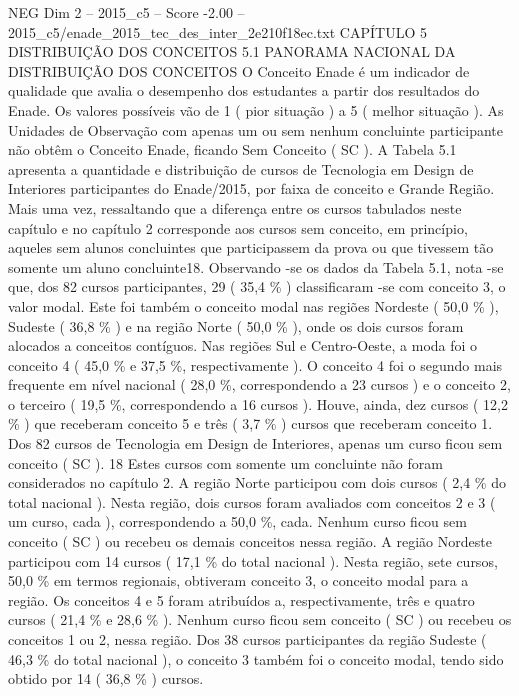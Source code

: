 \begin{textsample}{NEG Dim 2 – 2015\_c5 – Score -2.00 – 2015\_c5/enade\_2015\_tec\_des\_inter\_2e210f18ec.txt}  \label{ex:f2_neg_152}
CAPÍTULO 5 DISTRIBUIÇÃO DOS CONCEITOS 5.1 PANORAMA NACIONAL DA DISTRIBUIÇÃO DOS CONCEITOS O Conceito Enade é um indicador de qualidade que avalia o desempenho dos estudantes a partir dos resultados do Enade.
Os valores possíveis vão de 1 ( pior situação ) a 5 ( melhor situação ).
As Unidades de Observação com apenas um ou sem nenhum concluinte participante não obtêm o Conceito Enade, ficando Sem Conceito ( SC ).
A Tabela 5.1 apresenta a quantidade e distribuição de cursos de Tecnologia em Design de Interiores participantes do Enade/2015, por faixa de conceito e Grande Região.
Mais uma vez, ressaltando que a diferença entre os cursos tabulados neste capítulo e no capítulo 2 corresponde aos cursos sem conceito, em princípio, aqueles sem alunos concluintes que participassem da prova ou que tivessem tão somente um aluno concluinte18.
Observando -se os dados da Tabela 5.1, nota -se que, dos 82 cursos participantes, 29 ( 35,4 \% ) classificaram -se com conceito 3, o valor modal.
Este foi também o conceito modal nas regiões Nordeste ( 50,0 \% ), Sudeste ( 36,8 \% ) e na região Norte ( 50,0 \% ), onde os dois cursos foram alocados a conceitos contíguos.
Nas regiões Sul e Centro-Oeste, a moda foi o conceito 4 ( 45,0 \% e 37,5 \%, respectivamente ).
O conceito 4 foi o segundo mais frequente em nível nacional ( 28,0 \%, correspondendo a 23 cursos ) e o conceito 2, o terceiro ( 19,5 \%, correspondendo a 16 cursos ).
Houve, ainda, dez cursos ( 12,2 \% ) que receberam conceito 5 e três ( 3,7 \% ) cursos que receberam conceito 1.
Dos 82 cursos de Tecnologia em Design de Interiores, apenas um curso ficou sem conceito ( SC ). 18 Estes cursos com somente um concluinte não foram considerados no capítulo 2.
A região Norte participou com dois cursos ( 2,4 \% do total nacional ).
Nesta região, dois cursos foram avaliados com conceitos 2 e 3 ( um curso, cada ), correspondendo a 50,0 \%, cada.
Nenhum curso ficou sem conceito ( SC ) ou recebeu os demais conceitos nessa região.
A região Nordeste participou com 14 cursos ( 17,1 \% do total nacional ).
Nesta região, sete cursos, 50,0 \% em termos regionais, obtiveram conceito 3, o conceito modal para a região.
Os conceitos 4 e 5 foram atribuídos a, respectivamente, três e quatro cursos ( 21,4 \% e 28,6 \% ).
Nenhum curso ficou sem conceito ( SC ) ou recebeu os conceitos 1 ou 2, nessa região.
Dos 38 cursos participantes da região Sudeste ( 46,3 \% do total nacional ), o conceito 3 também foi o conceito modal, tendo sido obtido por 14 ( 36,8 \% ) cursos.

\end{textsample}
